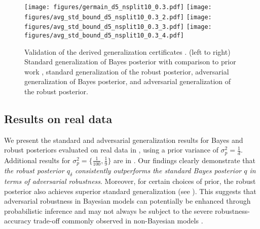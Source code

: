 \begin{figure*}[t]
    \centering\vspace{-0.1cm}
    \texttt{[image: figures/germain\_d5\_nsplit10\_0.3.pdf]}
    \texttt{[image: figures/avg\_std\_bound\_d5\_nsplit10\_0.3\_2.pdf]}
    \texttt{[image: figures/avg\_std\_bound\_d5\_nsplit10\_0.3\_3.pdf]}
    \texttt{[image: figures/avg\_std\_bound\_d5\_nsplit10\_0.3\_4.pdf]}
    \caption{Validation of the derived generalization certificates . (left to right) Standard generalization of Bayes posterior with comparison to prior work \citet{germain2016pac}, standard generalization of the robust posterior, adversarial generalization of Bayes posterior, and adversarial generalization of the robust posterior. %
    \label{fig:pac_bounds}}
    \vspace{-0.3cm}
\end{figure*}

\subsection{Results on real data}

We present the standard and adversarial generalization results for Bayes and robust posteriors evaluated on real data  in , using a prior variance of $\sigma_p^2 = \frac{1}{d}$. Additional results for $\sigma_p^2 = \{\frac{1}{100}, \frac{1}{9}\}$ are in . 
Our findings clearly demonstrate that \emph{the robust posterior $q_\delta$ consistently outperforms the standard Bayes posterior $q$ in terms of adversarial robustness}. Moreover, for certain choices of prior, the robust posterior also achieves superior standard generalization (see ). %
This suggests that adversarial robustness in Bayesian models can potentially be enhanced through probabilistic inference and may not always be subject to the severe robustness-accuracy trade-off commonly observed in non-Bayesian models \citep{tsipras2019robustness}.

